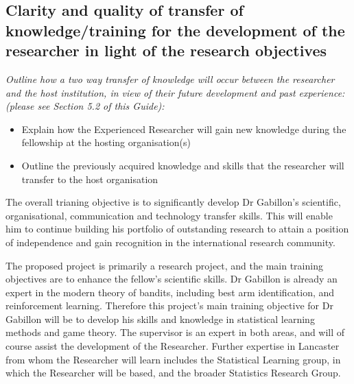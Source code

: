 \documentclass[a4paper,11pt]{article}
\renewcommand{\cite}{\autocite} %
\begin{document}
\subsection{Clarity and quality of transfer of knowledge/training for the development of the researcher in light of the research objectives}
\label{sec:transfer}

{\em Outline how a two way transfer of knowledge will occur between the researcher and the host institution, in view of their future development and past experience: (please see Section 5.2 of this Guide):
\begin{itemize}
\item Explain how the Experienced Researcher will gain new knowledge during the fellowship at the hosting organisation(s)
\item Outline the previously acquired knowledge and skills that the researcher will transfer to the host organisation
\end{itemize}
}

The overall trianing objective is to significantly develop Dr Gabillon's scientific, organisational, communication and technology transfer skills.  This will enable him to continue building his portfolio of outstanding research to attain a position of independence and gain recognition in the international research community.

The proposed project is primarily a research project, and the main training objectives are to enhance the fellow's scientific skills. Dr Gabillon is already an expert in the modern theory of bandits, including best arm identification, and reinforcement learning.  Therefore this project's main training objective for Dr Gabillon will be to develop his skills and knowledge in statistical learning methods and game theory.  The supervisor is an expert in both areas, and will of course assist the development of the Researcher.  Further expertise in Lancaster from whom the Researcher will learn includes the Statistical Learning group, in which the Researcher will be based, and the broader Statistics Research Group.
\end{document}
